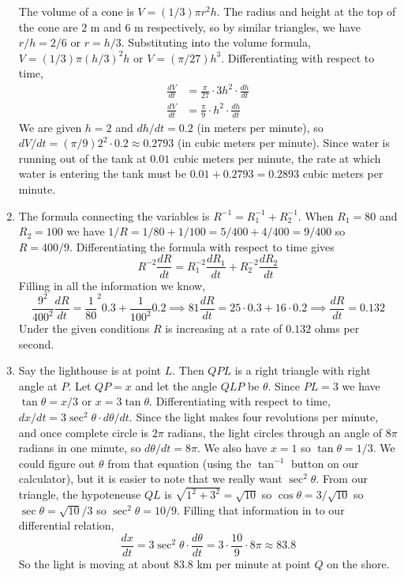 \documentclass{article}
\begin{document}
\begin{enumerate}
  The volume of a cone is $V=(1/3)\pi r^2 h$.  The radius and height at the
  top of the cone are $2$ m and $6$ m respectively, so by similar triangles,
  we have $r/h=2/6$ or $r=h/3$.  Substituting into the volume formula,
  $V=(1/3) \pi (h/3)^2 h$ or $V=(\pi/27) h^3$.  Differentiating with respect
  to time,
  \begin{align*}
    \frac{dV}{dt} &= \frac{\pi}{27} \cdot 3h^2 \cdot \frac{dh}{dt} \\
    \frac{dV}{dt} &= \frac{\pi}{9} \cdot h^2 \cdot \frac{dh}{dt}
  \end{align*}
  We are given $h=2$ and $dh/dt=0.2$ (in meters per minute), so
  $dV/dt=(\pi/9) 2^2 \cdot 0.2 \approx 0.2793$ (in cubic meters per minute).
  Since water is running out of the tank at $0.01$ cubic meters per minute,
  the rate at which water is entering the tank must be $0.01+0.2793=0.2893$
  cubic meters per minute.
\item %
  The formula connecting the variables is $R^{-1}=R_1^{-1}+R_2^{-1}$.
  When $R_1=80$ and $R_2=100$ we have $1/R = 1/80+1/100= 5/400+4/400=9/400$
  so $R=400/9$.  Differentiating the formula with respect to time gives
  \begin{equation*}
    R^{-2} \frac{dR}{dt} = R_1^{-2} \frac{dR_1}{dt} + R_2^{-2} \frac{dR_2}{dt}
  \end{equation*}
  Filling in all the information we know,
  \begin{equation*}
    \frac{9^2}{400^2} \frac{dR}{dt}
    = \frac{1}{80}^2 0.3 + \frac{1}{100^2} 0.2
    \implies 81 \frac{dR}{dt} = 25 \cdot 0.3 + 16 \cdot 0.2
    \implies \frac{dR}{dt} = 0.132
  \end{equation*}
  Under the given conditions $R$ is increasing at a rate of $0.132$ ohms per
  second.
\item %
  Say the lighthouse is at point $L$.  Then $QPL$ is a right triangle with
  right angle at $P$.  Let $QP=x$ and let the angle $QLP$ be $\theta$.  
  Since $PL=3$ we have $\tan\theta = x/3$ or $x=3\tan\theta$.  Differentiating
  with respect to time, $dx/dt = 3\sec^2\theta \cdot d\theta/dt$.  Since the
  light makes four revolutions per minute, and once complete circle is $2\pi$
  radians, the light circles through an angle of $8\pi$ radians in one minute,
  so $d\theta/dt=8\pi$.  We also have $x=1$ so $\tan\theta = 1/3$.  We could
  figure out $\theta$ from that equation (using the $\tan^{-1}$ button on
  our calculator), but it is easier to note that we really want $\sec^2\theta$.
  From our triangle, the hypoteneuse $QL$ is $\sqrt{1^2+3^2}=\sqrt{10}$ so
  $\cos\theta=3/\sqrt{10}$ so $\sec\theta=\sqrt{10}/3$ so $\sec^2\theta=10/9$.
  Filling that information in to our differential relation,
  \begin{equation*}
    \frac{dx}{dt} = 3\sec^2\theta \cdot \frac{d\theta}{dt}
    = 3 \cdot \frac{10}{9} \cdot 8\pi
    \approx 83.8
  \end{equation*}
  So the light is moving at about 83.8 km per minute at point $Q$ on the 
  shore.
\end{enumerate}
\end{document}
